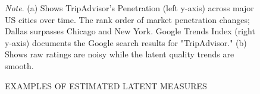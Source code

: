 \documentclass[mksc,blindrev]{informs3} %
\begin{document}
\begin{figure}[htp]
\centering
{}


\begin{flushleft}
\small
\textit{Note}. (a) Shows TripAdvisor's Penetration (left y-axis) across major US cities over time. The rank order of market penetration changes; Dallas surpasses Chicago and New York. Google Trends Index (right y-axis) documents the Google search results for "TripAdvisor." (b) Shows raw  ratings  are  noisy  while the latent quality trends are smooth.
\end{flushleft}

\caption{EXAMPLES OF ESTIMATED LATENT MEASURES}
\end{figure}
\clearpage
\end{document}
